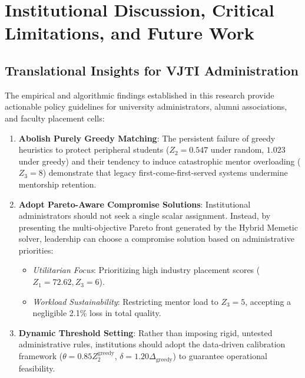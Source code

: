 \chapter{Institutional Discussion, Critical Limitations, and Future Work}
\label{ch:discussion}

\section{Translational Insights for VJTI Administration}
The empirical and algorithmic findings established in this research provide actionable policy guidelines for university administrators, alumni associations, and faculty placement cells:
\begin{enumerate}
    \item \textbf{Abolish Purely Greedy Matching}: The persistent failure of greedy heuristics to protect peripheral students ($Z_2 = 0.547$ under random, $1.023$ under greedy) and their tendency to induce catastrophic mentor overloading ($Z_3 = 8$) demonstrate that legacy first-come-first-served systems undermine mentorship retention.
    \item \textbf{Adopt Pareto-Aware Compromise Solutions}: Institutional administrators should not seek a single scalar assignment. Instead, by presenting the multi-objective Pareto front generated by the Hybrid Memetic solver, leadership can choose a compromise solution based on administrative priorities:
    \begin{itemize}
        \item \textit{Utilitarian Focus}: Prioritizing high industry placement scores ($Z_1 = 72.62, Z_3 = 6$).
        \item \textit{Workload Sustainability}: Restricting mentor load to $Z_3 = 5$, accepting a negligible 2.1\% loss in total quality.
    \end{itemize}
    \item \textbf{Dynamic Threshold Setting}: Rather than imposing rigid, untested administrative rules, institutions should adopt the data-driven calibration framework ($\theta = 0.85 Z_2^{\text{greedy}}$, $\delta = 1.20 \Delta_{\text{greedy}}$) to guarantee operational feasibility.
\end{enumerate}

